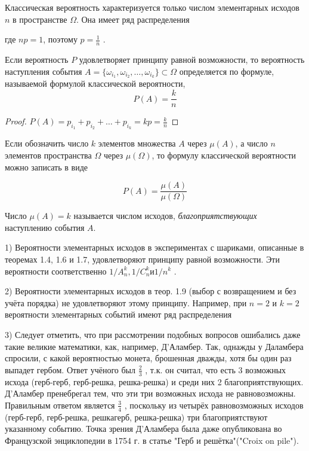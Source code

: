 Классическая вероятность характеризуется только числом элементарных исходов $n$ в пространстве $\Omega$. Она имеет ряд распределения

\begin{table}
\end{table}

где $np = 1$, поэтому $p = \frac{1}{n}$ .


\begin{lemma}
Если вероятность $P$ удовлетворяет принципу равной возможности, то вероятность наступления события $A = \{ \omega_{i_1} , \omega_{i_2} , \ldots , \omega_{i_k} \} \subset \Omega$ определяется по формуле, называемой формулой классической вероятности,
$$P(A) = \frac{k}{n}$$
\end{lemma} 

\begin{proof}
	$P(A) = p_{i_1} + p_{i_2} + \ldots + p_{i_k} = kp = \frac{k}{n}$
\end{proof}

Если обозначить число $k$ элементов множества $A$ через $\mu(A)$, а число $n$ элементов пространства $\Omega$ через $\mu(\Omega)$, то формулу классической вероятности
можно записать в виде

$$P(A) = \frac{\mu(A)}{\mu(\Omega)}$$

Число $\mu(A) = k$ называется числом исходов, \textit{благоприятствующих} наступлению события $A$.
\begin{zam}

1) Вероятности элементарных исходов в экспериментах
с шариками, описанные в теоремах 1.4, 1.6 и 1.7, удовлетворяют принципу равной возможности. Эти вероятности соответственно $1/A_n^k , 1/C_n^k и 1/n^k$ .

2) Вероятности элементарных исходов в теор. 1.9 (выбор с возвращением и без учёта порядка) не удовлетворяют этому принципу. Например, при $n = 2$
и $k = 2$ вероятности элементарных событий имеют ряд распределения

\begin{table}
\end{table}

3) Следует отметить, что при рассмотрении подобных вопросов ошибались даже такие великие математики, как, например, Д’Аламбер. Так, однажды у Даламбера спросили, с какой вероятностью монета, брошенная дважды, хотя бы один раз выпадет гербом. Ответ учёного был $\frac{2}{3}$ , т.к. он считал, что есть 3 возможных исхода (герб-герб, герб-решка, решка-решка) и среди них 2 благоприятствующих. Д’Аламбер пренебрегал тем, что эти три возможных исхода не равновозможны. Правильным ответом является $\frac{3}{4}$ , поскольку из четырёх равновозможных исходов (герб-герб, герб-решка, решкагерб, решка-решка) три благоприятствуют указанному событию. Точка зрения Д’Аламбера была даже опубликована во Французской энциклопедии в 1754 г. в статье "Герб и решётка"("Croix on pile").
\end{zam}
 

